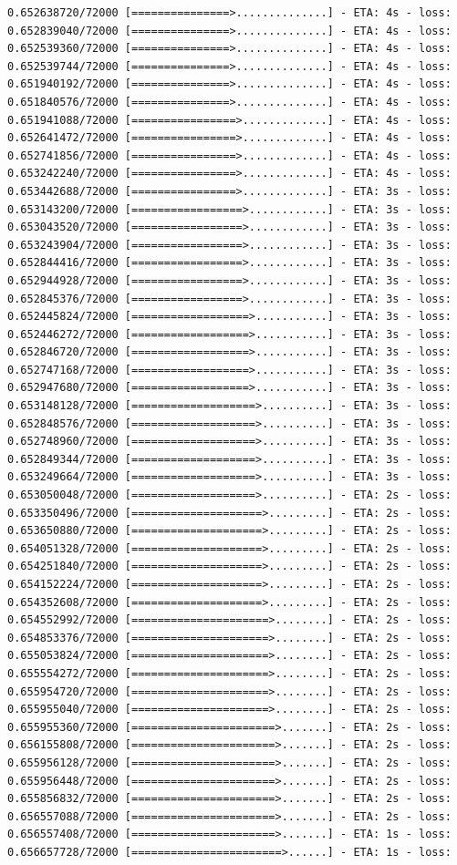 \documentclass[12pt,fleqn]{article}\usepackage{../../common}
\begin{document}
\begin{verbatim}
0.652638720/72000 [===============>..............] - ETA: 4s - loss: 0.652839040/72000 [===============>..............] - ETA: 4s - loss: 0.652539360/72000 [===============>..............] - ETA: 4s - loss: 0.652539744/72000 [===============>..............] - ETA: 4s - loss: 0.651940192/72000 [===============>..............] - ETA: 4s - loss: 0.651840576/72000 [===============>..............] - ETA: 4s - loss: 0.651941088/72000 [================>.............] - ETA: 4s - loss: 0.652641472/72000 [================>.............] - ETA: 4s - loss: 0.652741856/72000 [================>.............] - ETA: 4s - loss: 0.653242240/72000 [================>.............] - ETA: 4s - loss: 0.653442688/72000 [================>.............] - ETA: 3s - loss: 0.653143200/72000 [=================>............] - ETA: 3s - loss: 0.653043520/72000 [=================>............] - ETA: 3s - loss: 0.653243904/72000 [=================>............] - ETA: 3s - loss: 0.652844416/72000 [=================>............] - ETA: 3s - loss: 0.652944928/72000 [=================>............] - ETA: 3s - loss: 0.652845376/72000 [=================>............] - ETA: 3s - loss: 0.652445824/72000 [==================>...........] - ETA: 3s - loss: 0.652446272/72000 [==================>...........] - ETA: 3s - loss: 0.652846720/72000 [==================>...........] - ETA: 3s - loss: 0.652747168/72000 [==================>...........] - ETA: 3s - loss: 0.652947680/72000 [==================>...........] - ETA: 3s - loss: 0.653148128/72000 [===================>..........] - ETA: 3s - loss: 0.652848576/72000 [===================>..........] - ETA: 3s - loss: 0.652748960/72000 [===================>..........] - ETA: 3s - loss: 0.652849344/72000 [===================>..........] - ETA: 3s - loss: 0.653249664/72000 [===================>..........] - ETA: 3s - loss: 0.653050048/72000 [===================>..........] - ETA: 2s - loss: 0.653350496/72000 [====================>.........] - ETA: 2s - loss: 0.653650880/72000 [====================>.........] - ETA: 2s - loss: 0.654051328/72000 [====================>.........] - ETA: 2s - loss: 0.654251840/72000 [====================>.........] - ETA: 2s - loss: 0.654152224/72000 [====================>.........] - ETA: 2s - loss: 0.654352608/72000 [====================>.........] - ETA: 2s - loss: 0.654552992/72000 [=====================>........] - ETA: 2s - loss: 0.654853376/72000 [=====================>........] - ETA: 2s - loss: 0.655053824/72000 [=====================>........] - ETA: 2s - loss: 0.655554272/72000 [=====================>........] - ETA: 2s - loss: 0.655954720/72000 [=====================>........] - ETA: 2s - loss: 0.655955040/72000 [=====================>........] - ETA: 2s - loss: 0.655955360/72000 [======================>.......] - ETA: 2s - loss: 0.656155808/72000 [======================>.......] - ETA: 2s - loss: 0.655956128/72000 [======================>.......] - ETA: 2s - loss: 0.655956448/72000 [======================>.......] - ETA: 2s - loss: 0.655856832/72000 [======================>.......] - ETA: 2s - loss: 0.656557088/72000 [======================>.......] - ETA: 2s - loss: 0.656557408/72000 [======================>.......] - ETA: 1s - loss: 0.656657728/72000 [=======================>......] - ETA: 1s - loss: 
\end{verbatim}
\end{document}
